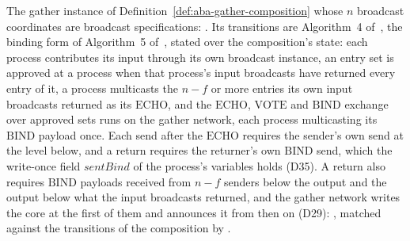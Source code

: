 \begin{definition}
  \label{def:aba-gather-over-broadcast-specification}
  \leanok
  The gather instance of Definition~\ref{def:aba-gather-composition} whose $n$ broadcast coordinates are broadcast specifications: .
  Its transitions are Algorithm~4 of~\cite{LeslieBP}, the binding form of Algorithm~5 of~\cite{AFW25}, stated over the composition's state: each process contributes its input through its own broadcast instance, an entry set is approved at a process when that process's input broadcasts have returned every entry of it, a process multicasts the $n{-}f$ or more entries its own input broadcasts returned as its $\mathrm{ECHO}$, and the $\mathrm{ECHO}$, $\mathrm{VOTE}$ and $\mathrm{BIND}$ exchange over approved sets runs on the gather network, each process multicasting its $\mathrm{BIND}$ payload once.
  Each send after the $\mathrm{ECHO}$ requires the sender's own send at the level below, and a return requires the returner's own $\mathrm{BIND}$ send, which the write-once field $\mathit{sentBind}$ of the process's variables holds (D35).
  A return also requires $\mathrm{BIND}$ payloads received from $n{-}f$ senders below the output and the output below what the input broadcasts returned, and the gather network writes the core at the first of them and announces it from then on (D29): , matched against the transitions of the composition by .
\end{definition}
